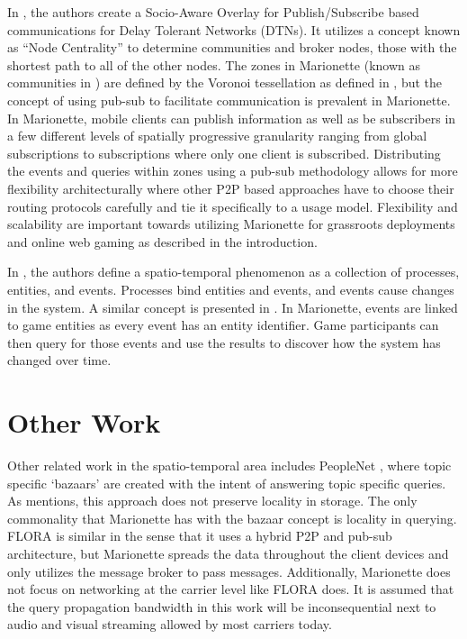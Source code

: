 \documentclass[12pt]{report}	%
\theoremstyle{definition}
\theoremstyle{remark}
\begin{document}
In \cite{yoneki2007socio}, the authors create a
Socio-Aware Overlay for Publish/Subscribe based communications for Delay
Tolerant Networks (DTNs). It utilizes a concept known as ``Node
Centrality'' to determine communities and broker nodes, those with the
shortest path to all of the other nodes. The zones in Marionette (known
as communities in \cite{yoneki2007socio}) are defined
by the Voronoi tessellation as defined in
\cite{zio2011p2p}, but the concept of using pub-sub to
facilitate communication is prevalent in Marionette. In Marionette, mobile
clients can publish information as well as be subscribers in a few
different levels of spatially progressive granularity ranging from global 
subscriptions to subscriptions where only one client is subscribed. Distributing the
events and queries within zones using a pub-sub methodology allows for
more flexibility architecturally where other
P2P based approaches have to choose their routing protocols carefully
and tie it specifically to a usage model. Flexibility and
scalability are important towards utilizing Marionette for grassroots
deployments and online web gaming as described in the introduction.

In \cite{wang2005event}, the authors define a
spatio-temporal phenomenon as a collection of processes, entities, and
events. Processes bind entities and events, and events cause changes in the
system. A similar concept is presented in
\cite{chen1998event}. In Marionette, events are linked to game entities as every event
has an entity identifier.  Game participants can then query for those events
and use the results to discover how the system has changed over time.

\section{Other Work}

Other related work in the spatio-temporal area includes PeopleNet
\cite{motani2005peoplenet}, where topic specific
`bazaars' are created with the intent of answering topic specific
queries. As \cite{zio2011p2p} mentions, this approach
does not preserve locality in storage. The only commonality that
Marionette has with the bazaar concept is locality in querying. FLORA
\cite{kokku2008enabling} is similar in the sense that
it uses a hybrid P2P and pub-sub architecture, but Marionette spreads the
data throughout the client devices and only utilizes the message broker to
pass messages. Additionally, Marionette does not focus on
networking at the carrier level like FLORA does. It is assumed that the
query propagation bandwidth in this work will be inconsequential next to
audio and visual streaming allowed by most carriers today.
\end{document}

